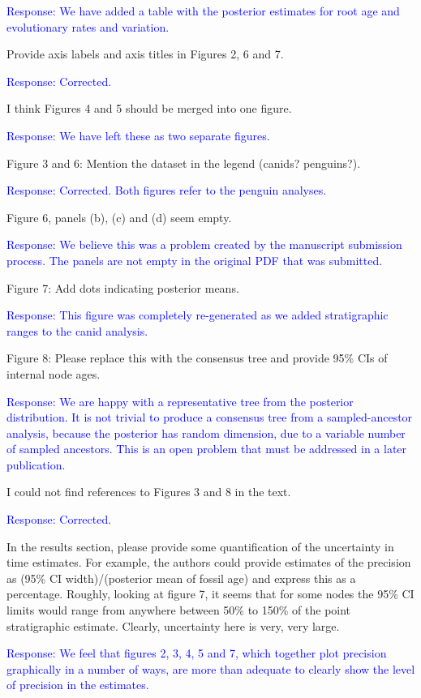 \documentclass[11pt]{article}
\newcommand{\response}[1]{\medskip{}\textcolor{blue}{{Response: #1}}\medskip{}}
\begin{document}
\response{
We have added a table with the posterior estimates for root age and evolutionary rates and variation.
}


Provide axis labels and axis titles in Figures 2, 6 and 7.

\response{Corrected.}

I think Figures 4 and 5 should be merged into one figure.

\response{We have left these as two separate figures.}

Figure 3 and 6: Mention the dataset in the legend (canids? penguins?).

\response{Corrected. Both figures refer to the penguin analyses.}

Figure 6, panels (b), (c) and (d) seem empty.

\response{We believe this was a problem created by the manuscript submission process. The panels are not empty in the original PDF that was submitted.}

Figure 7: Add dots indicating posterior means.

\response{This figure was completely re-generated as we added stratigraphic ranges to the canid analysis.}

Figure 8: Please replace this with the consensus tree and provide 95\% CIs of internal node ages.

\response{We are happy with a representative tree from the posterior distribution. It is not trivial to produce a consensus tree from a sampled-ancestor analysis, because the posterior has random dimension, due to a variable number of sampled ancestors. This is an open problem that must be addressed in a later publication.} 

I could not find references to Figures 3 and 8 in the text.

\response{Corrected.}

In the results section, please provide some quantification of the uncertainty in time estimates. For example,  the authors could provide estimates of the precision as (95\% CI width)/(posterior mean of fossil age) and express this as a percentage. Roughly, looking at figure 7, it seems that for some nodes the 95\% CI limits would range from anywhere between 50\% to 150\% of the point stratigraphic estimate. Clearly, uncertainty here is very, very large. 

\response{We feel that figures 2, 3, 4, 5 and 7, which together plot precision graphically in a number of ways, are more than adequate to clearly show the level of precision in the estimates.}
\end{document}
